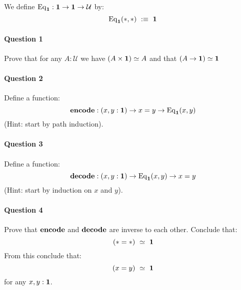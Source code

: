 \documentclass{article}[6pt]%
\newcommand{\U}{{\mathcal U}}
\renewcommand{\r}{\rightarrow}
\newcommand{\one}{{\bf 1}}
\newcommand{\Eq}{\mathrm{Eq}}
\newcommand{\encode}{\mathrm{\bf encode}}
\newcommand{\decode}{\mathrm{\bf decode}}
\begin{document}
\begin{Exercise}[title={The unit type}]

We define $\Eq_\one : \one \r \one \r \U$ by:
\[\Eq_\one(*,*) \ :\equiv\ \one\]

\paragraph{Question 1} Prove that for any $A:\U$ we have $(A\times \one) \simeq A$ and that $(A\r\one)\simeq\one$

\paragraph{Question 2} Define a function:
\[\encode : (x,y:\one) \r x=y \r \Eq_\one(x,y)\]
(Hint: start by path induction).

\paragraph{Question 3} Define a function:
\[\decode : (x,y:\one) \r \Eq_\one(x,y)\r x=y\]
(Hint: start by induction on $x$ and $y$).

\paragraph{Question 4} Prove that $\encode$ and $\decode$ are inverse to each other. Conclude that:
\[(*=*) \ \simeq \ \one\]
From this conclude that:
\[(x=y) \ \simeq\ \one\]
for any $x,y:\one$.
\end{Exercise}
\end{document}
